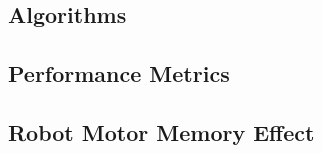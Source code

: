 \subsection{Algorithms}\label{ch:foundations:learning:algorithms}

\subsection{Performance Metrics}\label{ch:foundations:learning:metrics}

\subsection{Robot Motor Memory Effect}\label{ch:foundations:learning:rmm}
